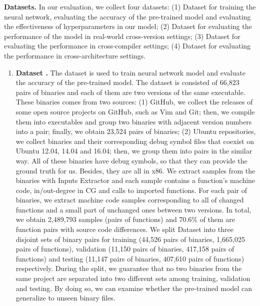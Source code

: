 \textbf{Datasets.} In our evaluation, we collect four datasets: 
(1) Dataset \uppercase\expandafter{} for training the neural network, evaluating the accuracy of the pre-trained model
 and evaluating the effectiveness of hyperparameters in our model; 
(2) Dataset \uppercase\expandafter{} for evaluating the performance of the model in real-world cross-version settings; 
(3) Dataset \uppercase\expandafter{} for evaluating the performance in cross-compiler settings; 
(4) Dataset \uppercase\expandafter{} for evaluating the performance in cross-architecture settings.
\begin{enumerate}
\item \textbf{Dataset \uppercase\expandafter{}.} 
  The dataset is used to train neural network model and evaluate the accuracy of the pre-trained model. 
  The dataset is consisted of 66,823 pairs of binaries and each of them are two versions of the same
   executable. 
  These binaries comes from two sources:
   (1) GitHub, we collect the releases of some open source projects on GitHub, such as Vim and Git;
    then, we compile them into executables and group two binaries with adjacent version numbers into a pair;
     finally, we obtain 23,524 pairs of binaries; 
  (2) Ubuntu repositories, we collect binaries and their corresponding debug symbol files that coexist on
   Ubuntu 12.04, 14.04 and 16.04; then, we group them into pairs in the similar way. 
   All of these binaries have debug symbols, so that they can provide the ground truth for us. 
   Besides, they are all in x86. We extract samples from the binaries with Inputs Extractor and each sample 
   contains a function’s machine code, in/out-degree in CG and calls to imported functions. 
   For each pair of binaries, we extract machine code samples corresponding to all of changed functions and a small part
    of unchanged ones between two versions. In total, we obtain 2,489,793 samples (pairs of functions) and
     70.6\% of them are function pairs with source code differences. 
     We split Dataset \uppercase\expandafter{} into three disjoint sets of binary pairs for training (44,526 pairs of binaries, 1,665,025 pairs of functions),
      validation (11,150 pairs of binaries, 417,158 pairs of functions) and testing (11,147 pairs of binaries, 407,610 pairs of functions)
       respectively. During the split, 
    we guarantee that no two binaries from the same project are separated into two different sets among
     training, validation and testing. 
    By doing so, we can examine whether the pre-trained model can generalize to unseen binary files.  

\end{enumerate}
